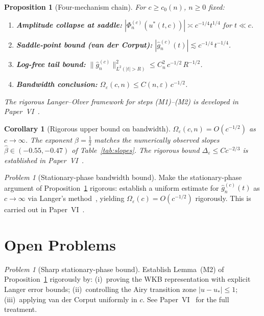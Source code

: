 \documentclass[12pt,a4paper]{amsart}
\newtheorem{proposition}[theorem]{Proposition}
\newtheorem{corollary}[theorem]{Corollary}
\theoremstyle{remark}
\newtheorem{problem}[theorem]{Problem}
\begin{document}
\begin{proposition}[Four-mechanism chain]
\label{prop:mechanism-chain}
For $c \ge c_0(n)$, $n \ge 0$ fixed:
\begin{enumerate}[\rm(M1)]
\item \textbf{Amplitude collapse at saddle:}
$|\Phi_n^{(c)}(u^*(t,c))| \asymp c^{-1/4}t^{1/4}$ for $t \ll c$.
\item \textbf{Saddle-point bound (van der Corput):}
$|\widehat{g}_n^{(c)}(t)| \lesssim c^{-1/4}\,t^{-1/4}$.
\item \textbf{Log-free tail bound:}
$\|\widehat{g}_n^{(c)}\|_{L^2(|t|>R)}^2 \le C_n^2\,c^{-1/2}\,R^{-1/2}$.
\item \textbf{Bandwidth conclusion:}
$\Omega_\varepsilon(c,n) \le C(n,\varepsilon)\,c^{-1/2}$.
\end{enumerate}
The rigorous Langer--Olver framework for steps (M1)--(M2)
is developed in Paper~VI~\cite{PaperVI}.
\end{proposition}

\begin{corollary}[Rigorous upper bound on bandwidth]
\label{cor:bandwidth-upper}
$\Omega_\varepsilon(c,n) = O(c^{-1/2})$ as $c\to\infty$.
The exponent $\beta=\tfrac12$ matches the numerically
observed slopes $\hat\beta\in(-0.55,-0.47)$ of Table~\ref{tab:slopes}.
The rigorous bound $\Delta_\varepsilon \le Cc^{-2/3}$ is established
in Paper~VI~\cite{PaperVI}.
\end{corollary}

\begin{problem}[Stationary-phase bandwidth bound]
\label{prob:stationary-phase-open}
Make the stationary-phase argument of Proposition~\ref{prop:mechanism-chain}
rigorous: establish a uniform estimate for $\widehat{g}_n^{(c)}(t)$
as $c \to \infty$ via Langer's method~\cite{Olver1974}, yielding
$\Omega_\varepsilon(c) = O(c^{-1/2})$ rigorously.
This is carried out in Paper~VI~\cite{PaperVI}.
\end{problem}

\section{Open Problems}
\label{sec:open}

\begin{problem}[Sharp stationary-phase bound]
\label{prob:sp-rigorous}
Establish Lemma~(M2) of Proposition~\ref{prop:mechanism-chain} rigorously
by: (i)~proving the WKB representation with explicit Langer error bounds;
(ii)~controlling the Airy transition zone $|u-u_*| \le 1$;
(iii)~applying van der Corput uniformly in $c$.
See Paper~VI~\cite{PaperVI} for the full treatment.
\end{problem}
\end{document}
